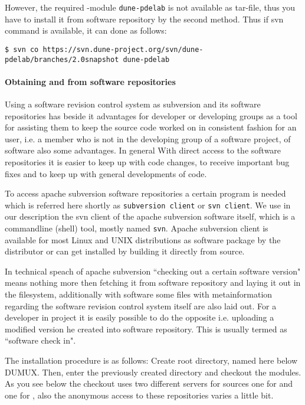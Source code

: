 However, the required \Dune-module \texttt{dune-pdelab} is not available as tar-file, thus you have to install it from software repository by the second method.  Thus if svn command is available, it can done as follows: 
\begin{lstlisting}[style=Bash]
$ svn co https://svn.dune-project.org/svn/dune-pdelab/branches/2.0snapshot dune-pdelab
\end{lstlisting}

\paragraph{Obtaining \Dune and \Dumux from software repositories} 

Using a software revision control system as subversion and its software repositories has beside it advantages for developer or developing groups as a tool for assisting them to keep the source code worked on in consistent fashion for an user, i.e. a member who is not in the developing group of a software project, of software also some advantages.
In general With direct access to the software repositories it is easier to keep up with code changes, to receive important bug fixes and to keep up with general developments of code.

To access apache subversion software repositories a certain program is needed which is referred here shortly as \texttt{subversion client} or \texttt{svn client}. We use in our description the svn client of the apache subversion software itself, which is a commandline (shell) tool, mostly named \texttt{svn}. 
Apache subversion client is available for most Linux and UNIX distributions as software package by the distributor or can get installed by building it directly from source.

In technical speach of apache subversion ``checking out a certain software version" means nothing more then fetching 
it from software repository and laying it out in the filesystem, additionally with software some files with metainformation regarding the software revision control system itself are also laid out.
For a developer in \Dumux project it is easily possible to do the opposite i.e. uploading a modified version he created into software repository. This is usually termed as ``software check in".

The installation procedure is as follows:
Create {\Dune} root directory, named here below DUMUX.
Then, enter the previously created directory and checkout the modules. 
As you see below the checkout uses two different servers for sources one for \Dune and one for \Dumux, also the 
anonymous access to these repositories varies a little bit. 

